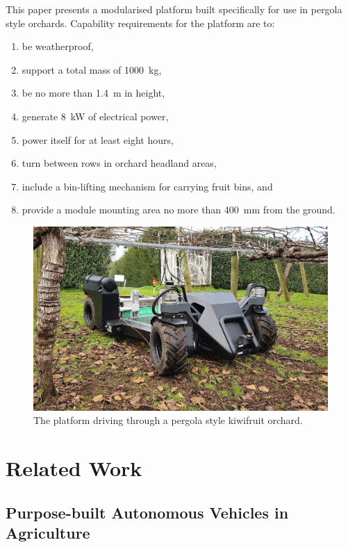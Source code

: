 \documentclass[preprint,authoryear,12pt]{elsarticle}
\begin{document}
    This paper presents a modularised platform built specifically for use in pergola style orchards.
    Capability requirements for the platform are to:
    \begin{enumerate}
        \item be weatherproof,
        \item support a total mass of \SI{1000}{\kilo\gram},
        \item be no more than \SI{1.4}{\meter} in height,
        \item generate \SI{8}{\kilo\watt} of electrical power,
        \item power itself for at least eight hours,
        \item turn between rows in orchard headland areas,
        \item include a bin-lifting mechanism for carrying fruit bins, and
        \item provide a module mounting area no more than \SI{400}{\milli\meter} from the ground.
    \end{enumerate}
    \begin{figure}[htb]
        \centering
        \includegraphics[width=\linewidth]{imgs/photos/suzy_general.jpg}
        \caption{
            The platform driving through a pergola style kiwifruit orchard.
        }
        \label{fig:suzy}
    \end{figure}


\section{Related Work}
\label{sect:review}

    \subsection{Purpose-built Autonomous Vehicles in Agriculture}
\end{document}
